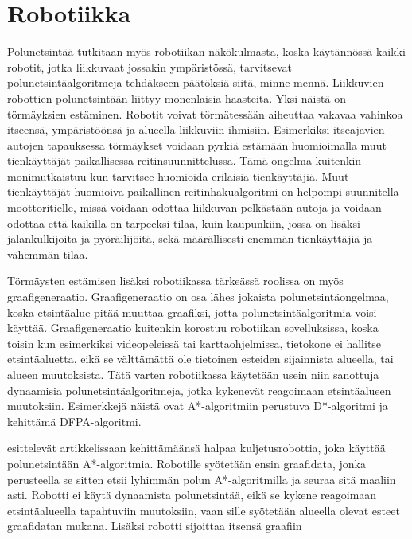 \section{Robotiikka}\label{robotiikka}
Polunetsintää tutkitaan myös robotiikan näkökulmasta, koska käytännössä 
kaikki robotit, jotka liikkuvaat jossakin ympäristössä, tarvitsevat 
polunetsintäalgoritmeja tehdäkseen päätöksiä siitä, minne 
mennä\cite{ProcediaAStar}. Liikkuvien robottien polunetsintään liittyy 
monenlaisia haasteita. Yksi näistä on törmäyksien estäminen\cite{ACMHindawi}. 
Robotit voivat törmätessään aiheuttaa vakavaa vahinkoa itseensä, 
ympäristöönsä ja alueella liikkuviin ihmisiin\cite{ProcediaAStar}. Esimerkiksi 
itseajavien autojen tapauksessa törmäykset voidaan pyrkiä estämään 
huomioimalla muut tienkäyttäjät paikallisessa reitinsuunnittelussa. Tämä 
ongelma kuitenkin monimutkaistuu kun tarvitsee huomioida erilaisia 
tienkäyttäjiä. Muut tienkäyttäjät huomioiva paikallinen reitinhakualgoritmi on 
helpompi suunnitella moottoritielle, missä voidaan odottaa liikkuvan 
pelkästään autoja ja voidaan odottaa että kaikilla on tarpeeksi tilaa, kuin 
kaupunkiin, jossa on lisäksi jalankulkijoita ja pyöräilijöitä, sekä 
määrällisesti enemmän tienkäyttäjiä ja vähemmän tilaa\cite{Lanelet2}.\par
	Törmäysten estämisen lisäksi robotiikassa tärkeässä roolissa on myös 
graafigeneraatio. Graafigeneraatio on osa lähes jokaista polunetsintäongelmaa, 
koska etsintäalue pitää muuttaa graafiksi, jotta polunetsintäalgoritmia voisi 
käyttää. Graafigeneraatio kuitenkin korostuu robotiikan sovelluksissa, koska 
toisin kun esimerkiksi videopeleissä tai karttaohjelmissa, tietokone ei 
hallitse etsintäaluetta, eikä se välttämättä ole tietoinen esteiden 
sijainnista alueella, tai alueen muutoksista. Tätä varten robotiikassa 
käytetään usein niin sanottuja dynaamisia polunetsintäalgoritmeja, jotka 
kykenevät reagoimaan etsintäalueen muutoksiin. Esimerkkejä näistä ovat 
A*-algoritmiin perustuva D*-algoritmi\cite{applSciLawande} ja 
\textcite{DelaunayVoronoiAStar} kehittämä DFPA-algoritmi. \par
	\textcite{transportRobotAStar} esittelevät artikkelissaan 
kehittämäänsä halpaa kuljetusrobottia, joka käyttää polunetsintään 
A*-algoritmia. Robotille syötetään ensin graafidata, jonka perusteella se 
sitten etsii lyhimmän polun A*-algoritmilla ja seuraa sitä maaliin asti. 
Robotti ei käytä dynaamista polunetsintää, eikä se kykene reagoimaan 
etsintäalueella tapahtuviin muutoksiin, vaan sille syötetään alueella olevat 
esteet graafidatan mukana. Lisäksi robotti sijoittaa itsensä graafiin 
